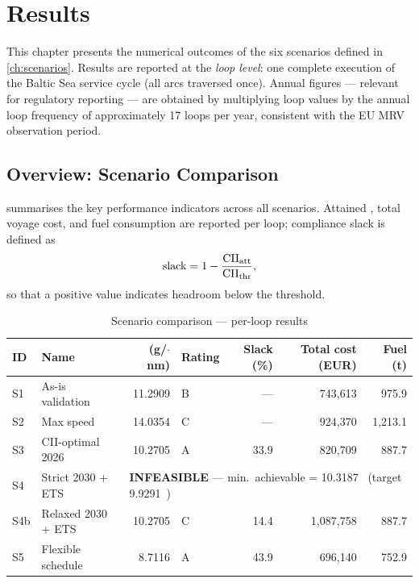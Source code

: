 \section{Results}
\label{ch:results}

This chapter presents the numerical outcomes of the six scenarios defined in
\cref{ch:scenarios}.  Results are reported at the \emph{loop level}: one
complete execution of the Baltic Sea service cycle (all arcs traversed once).
Annual figures --- relevant for regulatory reporting --- are obtained by
multiplying loop values by the annual loop frequency of approximately 17
loops per year, consistent with the EU MRV observation period.

\subsection{Overview: Scenario Comparison}
\label{sec:res:overview}

 summarises the key performance indicators
across all scenarios.  Attained \CII{}, total voyage cost, and fuel
consumption are reported per loop; compliance slack is defined as
\begin{equation}
  \text{slack} = 1 - \frac{\mathrm{CII}_{\mathrm{att}}}{\mathrm{CII}_{\mathrm{thr}}},
  \label{eq:slack}
\end{equation}
so that a positive value indicates headroom below the threshold.

\begin{table}[h]
\centering
\caption{Scenario comparison --- per-loop results}
\label{tab:scenario_comparison}
\begin{tabular}{llrlrrr}
  \toprule
  ID & Name
     & {\CII{} (g/\GT{}$\cdot$nm)}
     & Rating
     & {Slack (\%)}
     & {Total cost (EUR)}
     & {Fuel (t)} \\
  \midrule
  S1  & As-is validation   & 11.2909 & B & ---   & 743{,}613 & 975.9 \\
  S2  & Max speed          & 14.0354 & C & ---   & 924{,}370 & 1{,}213.1 \\
  S3  & CII-optimal 2026   & 10.2705 & A & 33.9  & 820{,}709 & 887.7 \\
  S4  & Strict 2030 + ETS  & \multicolumn{5}{l}{\textbf{INFEASIBLE} --- min.\ achievable \CII{} = 10.3187~\gGTnm{}
       (target 9.9291~\gGTnm{})} \\
  S4b & Relaxed 2030 + ETS & 10.2705 & C & 14.4  & 1{,}087{,}758 & 887.7 \\
  S5  & Flexible schedule  & 8.7116  & A & 43.9  & 696{,}140 & 752.9 \\
  \bottomrule
\end{tabular}
\end{table}

